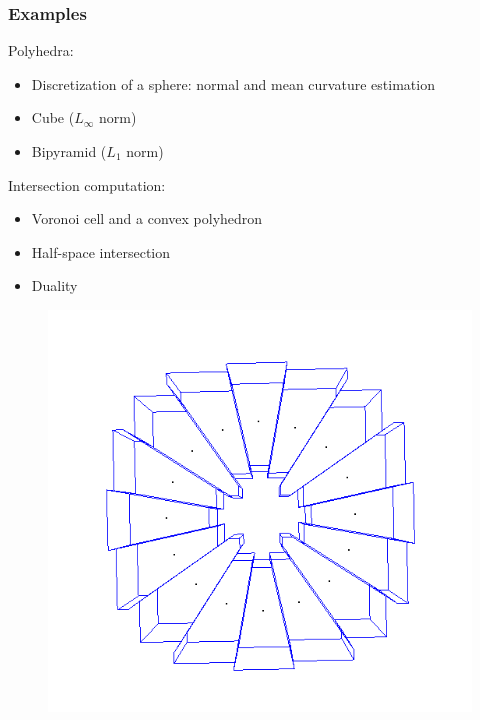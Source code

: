 \documentclass{beamer}
\begin{document}
\begin{frame}
    \frametitle{Examples}

    Polyhedra:
    \begin{itemize}
        \item Discretization of a sphere: normal and mean curvature estimation
        \item Cube ($ L_{\infty} $ norm)
        \item Bipyramid ($ L_1 $ norm)
    \end{itemize}

    Intersection computation:
    \begin{itemize}
        \item Voronoi cell and a convex polyhedron
        \item Half-space intersection
        \item Duality
    \end{itemize}

    \begin{figure}
        \centering
        \includegraphics[scale=0.2]{img/circle-cube-inter}
    \end{figure}
\end{frame}
\end{document}
